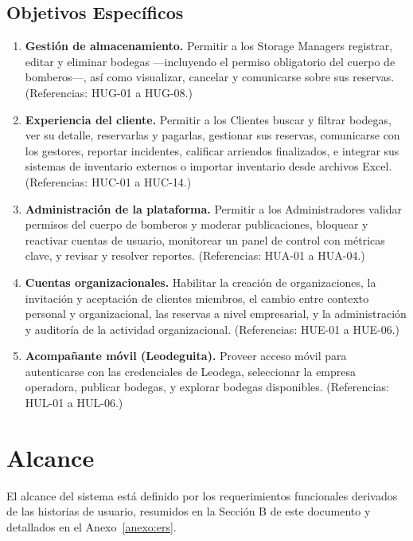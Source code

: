 \subsection*{Objetivos Específicos}
\begin{enumerate}[leftmargin=*]
    \item \textbf{Gestión de almacenamiento.} Permitir a los Storage Managers registrar, editar y eliminar bodegas ---incluyendo el permiso obligatorio del cuerpo de bomberos---, así como visualizar, cancelar y comunicarse sobre sus reservas. (Referencias: HUG-01 a HUG-08.)
    \item \textbf{Experiencia del cliente.} Permitir a los Clientes buscar y filtrar bodegas, ver su detalle, reservarlas y pagarlas, gestionar sus reservas, comunicarse con los gestores, reportar incidentes, calificar arriendos finalizados, e integrar sus sistemas de inventario externos o importar inventario desde archivos Excel. (Referencias: HUC-01 a HUC-14.)
    \item \textbf{Administración de la plataforma.} Permitir a los Administradores validar permisos del cuerpo de bomberos y moderar publicaciones, bloquear y reactivar cuentas de usuario, monitorear un panel de control con métricas clave, y revisar y resolver reportes. (Referencias: HUA-01 a HUA-04.)
    \item \textbf{Cuentas organizacionales.} Habilitar la creación de organizaciones, la invitación y aceptación de clientes miembros, el cambio entre contexto personal y organizacional, las reservas a nivel empresarial, y la administración y auditoría de la actividad organizacional. (Referencias: HUE-01 a HUE-06.)
    \item \textbf{Acompañante móvil (Leodeguita).} Proveer acceso móvil para autenticarse con las credenciales de Leodega, seleccionar la empresa operadora, publicar bodegas, y explorar bodegas disponibles. (Referencias: HUL-01 a HUL-06.)
\end{enumerate}

\section{Alcance}

El alcance del sistema está definido por los requerimientos funcionales derivados de las historias de usuario, resumidos en la Sección B de este documento y detallados en el Anexo~\ref{anexo:ers}.

